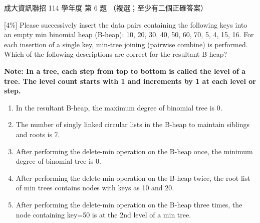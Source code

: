 \begin{pastexam}[label={px:ncku-114-prog-06}]{成大資訊聯招 114 學年度 第 6 題}
（複選；至少有二個正確答案）

{[4\%]} Please successively insert the data pairs containing the following keys into an empty min binomial heap (B-heap): 10, 20, 30, 40, 50, 60, 70, 5, 4, 15, 16. For each insertion of a single key, min-tree joining (pairwise combine) is performed. Which of the following descriptions are correct for the resultant B-heap?

\textbf{Note: In a tree, each step from top to bottom is called the level of a tree. The level count starts with 1 and increments by 1 at each level or step.}
\begin{enumerate}[label=(\Alph*)]
\item In the resultant B-heap, the maximum degree of binomial tree is 0.
\item The number of singly linked circular lists in the B-heap to maintain siblings and roots is 7.
\item After performing the delete-min operation on the B-heap once, the minimum degree of binomial tree is 0.
\item After performing the delete-min operation on the B-heap twice, the root list of min trees contains nodes with keys as 10 and 20.
\item After performing the delete-min operation on the B-heap three times, the node containing key=50 is at the 2nd level of a min tree.
\end{enumerate}
\end{pastexam}

